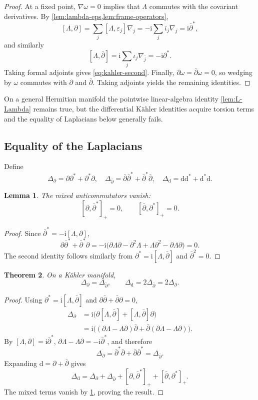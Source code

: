 \documentclass[11pt,reqno]{amsart}
\newtheorem{theorem}{Theorem}[section]
\newtheorem{lemma}[theorem]{Lemma}
\theoremstyle{definition}
\theoremstyle{remark}
\newcommand{\dd}{\mathrm{d}}
\newcommand{\ii}{\mathrm{i}}
\newcommand{\dbar}{\bar\partial}
\begin{document}
\begin{proof}
At a fixed point, $\nabla\omega=0$ implies that $\Lambda$ commutes with the
covariant derivatives. By \cref{lem:lambda-eps,lem:frame-operators},
\[
[\Lambda,\partial]
=\sum_j[\Lambda,\varepsilon_j]\nabla_j
=-\ii\sum_j\bar\iota_j\nabla_j
=\ii\dbar^*,
\]
and similarly
\[
[\Lambda,\dbar]
=\ii\sum_j\iota_j\nabla_{\bar j}
=-\ii\partial^*.
\]
Taking formal adjoints gives \eqref{eq:kahler-second}. Finally,
$\partial\omega=\dbar\omega=0$, so wedging by $\omega$ commutes with
$\partial$ and $\dbar$. Taking adjoints yields the remaining identities.
\end{proof}

On a general Hermitian manifold the pointwise linear-algebra identity
\cref{lem:L-Lambda} remains true, but the differential K\"ahler identities
acquire torsion terms and the equality of Laplacians below generally fails.

\subsection{Equality of the Laplacians}

Define
\[
\Delta_\partial=\partial\partial^*+\partial^*\partial,
\quad
\Delta_{\dbar}=\dbar\dbar^*+\dbar^*\dbar,
\quad
\Delta_\dd=\dd\dd^*+\dd^*\dd.
\]

\begin{lemma}
\label{lem:mixed-terms}
The mixed anticommutators vanish:
\[
[\partial,\dbar^*]_+=0,
\qquad
[\dbar,\partial^*]_+=0.
\]
\end{lemma}

\begin{proof}
Since $\dbar^*=-\ii[\Lambda,\partial]$,
\[
\partial\dbar^*+\dbar^*\partial
=-\ii\bigl(
\partial\Lambda\partial-\partial^2\Lambda
+\Lambda\partial^2-\partial\Lambda\partial
\bigr)=0.
\]
The second identity follows similarly from
$\partial^*=\ii[\Lambda,\dbar]$ and $\dbar^2=0$.
\end{proof}

\begin{theorem}
\label{thm:laplacian-equality}
On a K\"ahler manifold,
\[
\Delta_\partial=\Delta_{\dbar},
\qquad
\Delta_\dd=2\Delta_{\dbar}=2\Delta_\partial.
\]
\end{theorem}

\begin{proof}
Using $\partial^*=\ii[\Lambda,\dbar]$ and
$\partial\dbar+\dbar\partial=0$,
\[
\begin{aligned}
\Delta_\partial
&=\ii\bigl(\partial[\Lambda,\dbar]+[\Lambda,\dbar]\partial\bigr)\\
&=\ii\bigl((\partial\Lambda-\Lambda\partial)\dbar
+\dbar(\partial\Lambda-\Lambda\partial)\bigr).
\end{aligned}
\]
By $[\Lambda,\partial]=\ii\dbar^*$,
$\partial\Lambda-\Lambda\partial=-\ii\dbar^*$, and therefore
\[
\Delta_\partial
=\dbar^*\dbar+\dbar\dbar^*
=\Delta_{\dbar}.
\]
Expanding $\dd=\partial+\dbar$ gives
\[
\Delta_\dd
=\Delta_\partial+\Delta_{\dbar}
+[\partial,\dbar^*]_++[\dbar,\partial^*]_+.
\]
The mixed terms vanish by \cref{lem:mixed-terms}, proving the result.
\end{proof}
\end{document}
